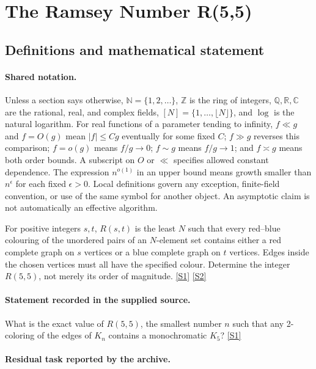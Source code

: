\documentclass[11pt,a4paper]{article}
\newcommand{\N}{\mathbb{N}}
\newcommand{\Z}{\mathbb{Z}}
\newcommand{\Q}{\mathbb{Q}}
\newcommand{\R}{\mathbb{R}}
\newcommand{\C}{\mathbb{C}}
\newcommand{\sref}[2]{\hyperlink{source:#1:#2}{[S#2]}}
\begin{document}
\section{The Ramsey Number R(5,5)}\label{statement}


\subsection{Definitions and mathematical statement}

\paragraph{Shared notation.}Unless a section says otherwise, $\N=\{1,2,\ldots\}$,
$\Z$ is the ring of integers, $\Q,\R,\C$ are the rational, real, and complex
fields, $[N]=\{1,\ldots,\lfloor N\rfloor\}$, and $\log$ is the natural
logarithm. For real functions of a parameter tending to infinity,
$f\ll g$ and $f=O(g)$ mean $|f|\leq Cg$ eventually for some fixed $C$;
$f\gg g$ reverses this comparison; $f=o(g)$ means $f/g\to0$;
$f\sim g$ means $f/g\to1$; and $f\asymp g$ means both order bounds.
A subscript on $O$ or $\ll$ specifies allowed constant dependence.
The expression $n^{o(1)}$ in an upper bound means growth smaller than
$n^\epsilon$ for each fixed $\epsilon>0$. Local definitions govern any
exception, finite-field convention, or use of the same symbol for another
object. An asymptotic claim is not automatically an effective algorithm.



For positive integers $s,t$, $R(s,t)$ is the least $N$ such that every red--blue colouring of the unordered pairs of an $N$-element set contains either a red complete graph on $s$ vertices or a blue complete graph on $t$ vertices. Edges inside the chosen vertices must all have the specified colour. Determine the integer $R(5,5)$, not merely its order of magnitude. \sref{statement}{1} \sref{statement}{2}

\paragraph{Statement recorded in the supplied source.}
What is the exact value of $R(5,5)$, the smallest number $n$ such that any 2-coloring of the edges of $K_n$ contains a monochromatic $K_5$? \sref{statement}{1}

\paragraph{Residual task reported by the archive.}
\end{document}
